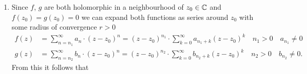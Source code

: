 \documentclass[11pt,a4paper]{article}
\begin{document}
\begin{solution} \phantom{}
\begin{enumerate}
  \item[(1)] Since $f$, $g$ are both holomorphic in a neighbourhood of
    $z_0 \in \mathbb{C}$ and $f(z_0) = g(z_0) = 0$ we can expand both functions
    as series around $z_0$ with some radius of convergence $r > 0$
    \begin{align*}
      f(z) &=
      \sum_{n=n_1}^\infty a_n \cdot (z - z_0)^n =
      (z - z_0)^{n_1} \cdot \sum_{k=0}^{\infty} a_{n_1+k} (z - z_0)^k
      \quad n_1 > 0 \quad a_{n_1} \neq 0 \\
      g(z) &=
      \sum_{n=n_2}^\infty b_n \cdot (z - z_0)^n =
      (z - z_0)^{n_2} \cdot \sum_{k=0}^{\infty} b_{n_2+k} (z - z_0)^k
      \quad n_2 > 0 \quad b_{n_2} \neq 0.
    \end{align*}
    From this it follows that
    \begin{enumerate}


\end{enumerate}
\end{enumerate}
\end{solution}
\end{document}
